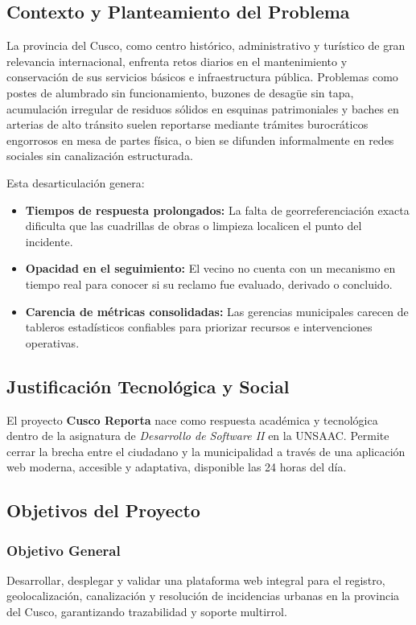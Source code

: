 \documentclass[12pt,a4paper]{article}
\begin{document}
\subsection{Contexto y Planteamiento del Problema}
La provincia del Cusco, como centro histórico, administrativo y turístico de gran relevancia internacional, enfrenta retos diarios en el mantenimiento y conservación de sus servicios básicos e infraestructura pública. Problemas como postes de alumbrado sin funcionamiento, buzones de desagüe sin tapa, acumulación irregular de residuos sólidos en esquinas patrimoniales y baches en arterias de alto tránsito suelen reportarse mediante trámites burocráticos engorrosos en mesa de partes física, o bien se difunden informalmente en redes sociales sin canalización estructurada.

Esta desarticulación genera:
\begin{itemize}[leftmargin=*]
    \item \textbf{Tiempos de respuesta prolongados:} La falta de georreferenciación exacta dificulta que las cuadrillas de obras o limpieza localicen el punto del incidente.
    \item \textbf{Opacidad en el seguimiento:} El vecino no cuenta con un mecanismo en tiempo real para conocer si su reclamo fue evaluado, derivado o concluido.
    \item \textbf{Carencia de métricas consolidadas:} Las gerencias municipales carecen de tableros estadísticos confiables para priorizar recursos e intervenciones operativas.
\end{itemize}

\subsection{Justificación Tecnológica y Social}
El proyecto \textbf{Cusco Reporta} nace como respuesta académica y tecnológica dentro de la asignatura de \textit{Desarrollo de Software II} en la UNSAAC. Permite cerrar la brecha entre el ciudadano y la municipalidad a través de una aplicación web moderna, accesible y adaptativa, disponible las 24 horas del día.

\subsection{Objetivos del Proyecto}
\subsubsection{Objetivo General}
Desarrollar, desplegar y validar una plataforma web integral para el registro, geolocalización, canalización y resolución de incidencias urbanas en la provincia del Cusco, garantizando trazabilidad y soporte multirrol.
\end{document}
